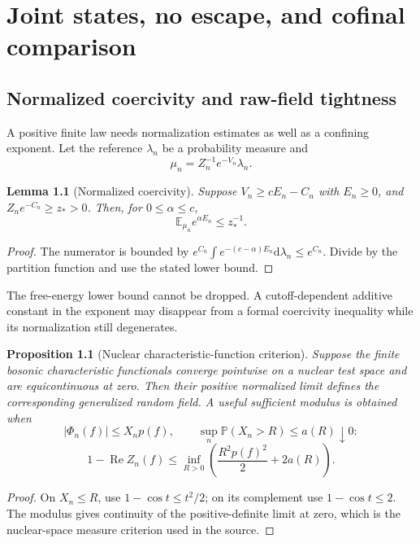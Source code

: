 \documentclass[11pt,a4paper,oneside]{book}
\theoremstyle{plain}
\newtheorem{proposition}[theorem]{Proposition}
\newtheorem{lemma}[theorem]{Lemma}
\theoremstyle{definition}
\theoremstyle{remark}
\newcommand{\E}{\mathbb E}
\newcommand{\dd}{\mathrm d}
\newcommand{\src}[2]{\cite{#1}}
\begin{document}
\chapter{Joint states, no escape, and cofinal comparison}
\label{ch:states}
\section{Normalized coercivity and raw-field tightness}
A positive finite law needs normalization estimates as well as a confining exponent. Let the reference $\lambda_n$ be a probability measure and
\begin{equation}
 \mu_n=Z_n^{-1}e^{-V_n}\lambda_n.
\end{equation}

\begin{lemma}[Normalized coercivity]
\label{lem:normalized-coercivity}
Suppose $V_n\ge cE_n-C_n$ with $E_n\ge0$, and $Z_ne^{-C_n}\ge z_*>0$. Then, for $0\le\alpha\le c$,
\begin{equation}
 \E_{\mu_n}e^{\alpha E_n}\le z_*^{-1}.
 \label{eq:normalized-coercivity}
\end{equation}
\end{lemma}
\begin{proof}
The numerator is bounded by $e^{C_n}\int e^{-(c-\alpha)E_n}\dd\lambda_n\le e^{C_n}$. Divide by the partition function and use the stated lower bound.
\end{proof}
\src{R9}{thm:n9v93-normalized-coercivity}
The free-energy lower bound cannot be dropped. A cutoff-dependent additive constant in the exponent may disappear from a formal coercivity inequality while its normalization still degenerates.

\begin{proposition}[Nuclear characteristic-function criterion]
\label{prop:minlos}
Suppose the finite bosonic characteristic functionals converge pointwise on a nuclear test space and are equicontinuous at zero. Then their positive normalized limit defines the corresponding generalized random field. A useful sufficient modulus is obtained when
\begin{equation}
 |\Phi_n(f)|\le X_np(f),\qquad
 \sup_n\mathbb P(X_n>R)\le a(R)\downarrow0:
\end{equation}
\begin{equation}
 1-\operatorname{Re}Z_n(f)
 \le\inf_{R>0}\left(\frac{R^2p(f)^2}{2}+2a(R)\right).
 \label{eq:characteristic-modulus}
\end{equation}
\end{proposition}
\begin{proof}
On $X_n\le R$, use $1-\cos t\le t^2/2$; on its complement use $1-\cos t\le2$. The modulus gives continuity of the positive-definite limit at zero, which is the nuclear-space measure criterion used in the source.
\end{proof}
\src{R9}{thm:n9v91-Minlos}
\end{document}
